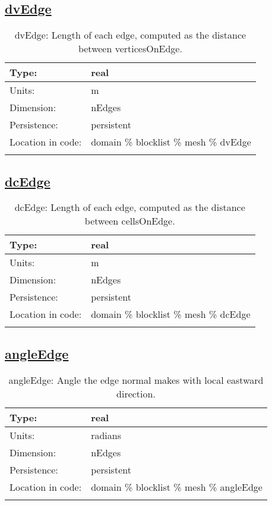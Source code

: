\subsection[dvEdge]{\hyperref[sec:var_tab_mesh]{dvEdge}}
\label{subsec:var_sec_mesh_dvEdge}
\begin{center}
\begin{longtable}{| p{2.0in} | p{4.0in} |}
        \hline 
        Type: & real \\
        \hline 
        Units: & \si{m} \\
        \hline 
        Dimension: & nEdges \\
        \hline 
        Persistence: & persistent \\
        \hline 
         Location in code: & domain \% blocklist \% mesh \% dvEdge \\
         \hline 
    \caption{dvEdge: Length of each edge, computed as the distance between verticesOnEdge.}
\end{longtable}
\end{center}
\subsection[dcEdge]{\hyperref[sec:var_tab_mesh]{dcEdge}}
\label{subsec:var_sec_mesh_dcEdge}
\begin{center}
\begin{longtable}{| p{2.0in} | p{4.0in} |}
        \hline 
        Type: & real \\
        \hline 
        Units: & \si{m} \\
        \hline 
        Dimension: & nEdges \\
        \hline 
        Persistence: & persistent \\
        \hline 
         Location in code: & domain \% blocklist \% mesh \% dcEdge \\
         \hline 
    \caption{dcEdge: Length of each edge, computed as the distance between cellsOnEdge.}
\end{longtable}
\end{center}
\subsection[angleEdge]{\hyperref[sec:var_tab_mesh]{angleEdge}}
\label{subsec:var_sec_mesh_angleEdge}
\begin{center}
\begin{longtable}{| p{2.0in} | p{4.0in} |}
        \hline 
        Type: & real \\
        \hline 
        Units: & \si{radians} \\
        \hline 
        Dimension: & nEdges \\
        \hline 
        Persistence: & persistent \\
        \hline 
         Location in code: & domain \% blocklist \% mesh \% angleEdge \\
         \hline 
    \caption{angleEdge: Angle the edge normal makes with local eastward direction.}
\end{longtable}
\end{center}
